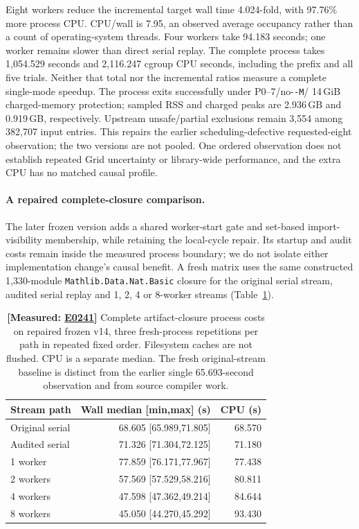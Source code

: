\documentclass[10pt,twocolumn]{article}
\newcommand{\measured}[1]{\textbf{[Measured: #1]}}
\newcommand{\expref}[2]{\href{https://github.com/yunwei37/proofserve/blob/main/docs/tmp/build-and-evaluate/step-#1/step-report.md}{E#2}}
\begin{document}
Eight workers reduce the incremental target wall time 4.024-fold,
with 97.76\% more process CPU.
CPU/wall is 7.95, an observed average occupancy rather than a count of
operating-system threads. Four workers take 94.183 seconds; one worker
remains slower than direct serial replay.
The complete process takes 1,054.529 seconds and 2,116.247 cgroup CPU seconds,
including the prefix and all five trials.
Neither that total nor the incremental ratios measure a complete single-mode
speedup. The process exits successfully under P0--7/no-\texttt{-M}/
14\,GiB charged-memory protection; sampled RSS and charged peaks are
2.936\,GB and 0.919\,GB, respectively.
Upstream unsafe/partial exclusions remain 3,554 among 382,707 input entries.
This repairs the earlier scheduling-defective requested-eight observation;
the two versions are not pooled.
One ordered observation does not establish repeated Grid uncertainty or
library-wide performance, and the extra CPU has no matched causal profile.

\paragraph{A repaired complete-closure comparison.}
The later frozen version adds a shared worker-start gate and set-based
import-visibility membership, while retaining the local-cycle repair.
Its startup and audit costs remain inside the measured process boundary;
we do not isolate either implementation change's causal benefit.
A fresh matrix uses the same constructed 1,330-module
\texttt{Mathlib.Data.Nat.Basic} closure for the original serial stream,
audited serial replay and 1, 2, 4 or 8-worker streams
(Table~\ref{tab:repairedstream}).

\begin{table}[t]
\centering\small\setlength{\tabcolsep}{3pt}
\begin{tabular}{lrr}
\toprule
Stream path & Wall median [min,max] (s) & CPU (s)\\
\midrule
Original serial &68.605 [65.989,71.805]&68.570\\
Audited serial &71.326 [71.304,72.125]&71.180\\
1 worker &77.859 [76.171,77.967]&77.438\\
2 workers &57.569 [57.529,58.216]&80.811\\
4 workers &47.598 [47.362,49.214]&84.644\\
8 workers &45.050 [44.270,45.292]&93.430\\
\bottomrule
\end{tabular}
\caption{\measured{\expref{0241-20261101T080929+0000}{0241}} Complete artifact-closure process costs on repaired frozen v14,
three fresh-process repetitions per path in repeated fixed order.
Filesystem caches are not flushed. CPU is a separate median.
The fresh original-stream baseline is distinct from the earlier single
65.693-second observation and from source compiler work.}
\label{tab:repairedstream}
\end{table}
\end{document}
